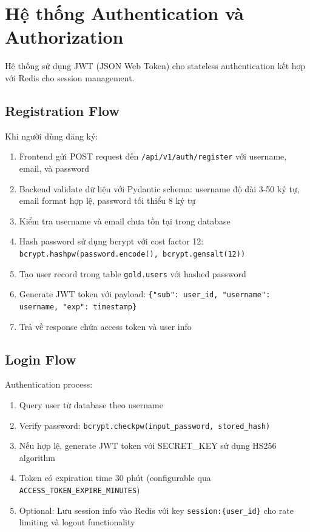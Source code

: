 \section{Hệ thống Authentication và Authorization}

Hệ thống sử dụng JWT (JSON Web Token) cho stateless authentication kết hợp với Redis cho session management.

\subsection{Registration Flow}

Khi người dùng đăng ký:
\begin{enumerate}
    \item Frontend gửi POST request đến \texttt{/api/v1/auth/register} với username, email, và password
    \item Backend validate dữ liệu với Pydantic schema: username độ dài 3-50 ký tự, email format hợp lệ, password tối thiểu 8 ký tự
    \item Kiểm tra username và email chưa tồn tại trong database
    \item Hash password sử dụng bcrypt với cost factor 12: \texttt{bcrypt.hashpw(password.encode(), bcrypt.gensalt(12))}
    \item Tạo user record trong table \texttt{gold.users} với hashed password
    \item Generate JWT token với payload: \texttt{\{"sub": user\_id, "username": username, "exp": timestamp\}}
    \item Trả về response chứa access token và user info
\end{enumerate}

\subsection{Login Flow}

Authentication process:
\begin{enumerate}
    \item Query user từ database theo username
    \item Verify password: \texttt{bcrypt.checkpw(input\_password, stored\_hash)}
    \item Nếu hợp lệ, generate JWT token với SECRET\_KEY sử dụng HS256 algorithm
    \item Token có expiration time 30 phút (configurable qua \texttt{ACCESS\_TOKEN\_EXPIRE\_MINUTES})
    \item Optional: Lưu session info vào Redis với key \texttt{session:\{user\_id\}} cho rate limiting và logout functionality
\end{enumerate}

